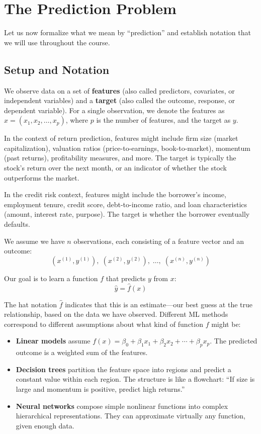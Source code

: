 \documentclass[11pt,a4paper]{article}
\newcommand{\keyword}[1]{\textbf{\textcolor{AccentOrange}{#1}}}
\begin{document}
\section{The Prediction Problem}

Let us now formalize what we mean by ``prediction'' and establish notation that we will use throughout the course.

\subsection{Setup and Notation}

We observe data on a set of \keyword{features} (also called predictors, covariates, or independent variables) and a \keyword{target} (also called the outcome, response, or dependent variable). For a single observation, we denote the features as $x = (x_1, x_2, \ldots, x_p)$, where $p$ is the number of features, and the target as $y$.

In the context of return prediction, features might include firm size (market capitalization), valuation ratios (price-to-earnings, book-to-market), momentum (past returns), profitability measures, and more. The target is typically the stock's return over the next month, or an indicator of whether the stock outperforms the market.

In the credit risk context, features might include the borrower's income, employment tenure, credit score, debt-to-income ratio, and loan characteristics (amount, interest rate, purpose). The target is whether the borrower eventually defaults.

We assume we have $n$ observations, each consisting of a feature vector and an outcome:
\[
(x^{(1)}, y^{(1)}), \; (x^{(2)}, y^{(2)}), \; \ldots, \; (x^{(n)}, y^{(n)})
\]

Our goal is to learn a function $f$ that predicts $y$ from $x$:
\[
\widehat{y} = \widehat{f}(x)
\]

The hat notation $\widehat{f}$ indicates that this is an estimate---our best guess at the true relationship, based on the data we have observed. Different ML methods correspond to different assumptions about what kind of function $f$ might be:

\begin{itemize}
    \item \textbf{Linear models} assume $f(x) = \beta_0 + \beta_1 x_1 + \beta_2 x_2 + \cdots + \beta_p x_p$. The predicted outcome is a weighted sum of the features.
    \item \textbf{Decision trees} partition the feature space into regions and predict a constant value within each region. The structure is like a flowchart: ``If size is large and momentum is positive, predict high returns.''
    \item \textbf{Neural networks} compose simple nonlinear functions into complex hierarchical representations. They can approximate virtually any function, given enough data.
\end{itemize}
\end{document}
